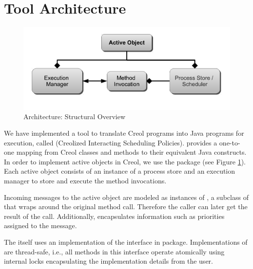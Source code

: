 

\section{Tool Architecture} \label{ch01:sec:compiler}


\begin{figure}[t]
\begin{center}
  \includegraphics[scale=0.36]{figs/manticore-concurrency-v4}
  \caption{\Crisp Architecture: Structural Overview}
  \label{ch01:fig:api}
\end{center}
\end{figure}

We have implemented a tool to translate Creol programs into Java programs for execution, called {\em \Crisp} (Creolized Interacting Scheduling Policies).
\Crisp provides a one-to-one mapping from Creol classes and methods to their equivalent Java constructs. 
In order to implement active objects in Creol, we use the  package (see Figure \ref{ch01:fig:api}).
Each active object consists of an instance of a process store  and an execution manager to store and execute the method invocations. 

Incoming messages to the active object are modeled as instances of \MethodInvocation, a subclass of  that  wraps around the original method call.
Therefore the caller can later get the result of the call.
Additionally, \MethodInvocation encapsulates information such as priorities assigned to the message. 

The  itself uses an implementation of the  interface in  package. Implementations of  are thread-safe, i.e.,  all methods in this interface operate atomically using internal locks encapsulating the implementation details from the user. 

